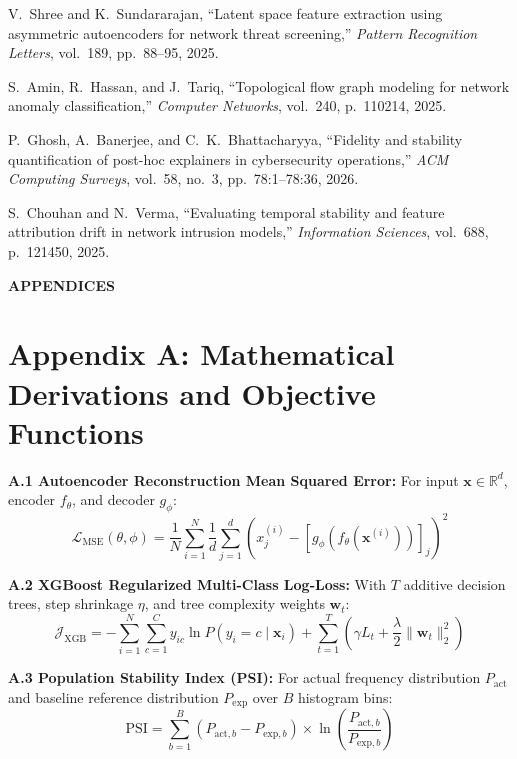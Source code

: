 \documentclass[12pt,a4paper]{report}
\begin{document}
\begin{enumerate}[label={[\arabic*]}, leftmargin=*, itemsep=4pt]
\item V.~Shree and K.~Sundararajan, ``Latent space feature extraction using asymmetric autoencoders for network threat screening,'' \emph{Pattern Recognition Letters}, vol.~189, pp.~88--95, 2025.
\item S.~Amin, R.~Hassan, and J.~Tariq, ``Topological flow graph modeling for network anomaly classification,'' \emph{Computer Networks}, vol.~240, p.~110214, 2025.
\item P.~Ghosh, A.~Banerjee, and C.~K.~Bhattacharyya, ``Fidelity and stability quantification of post-hoc explainers in cybersecurity operations,'' \emph{ACM Computing Surveys}, vol.~58, no.~3, pp.~78:1--78:36, 2026.
\item S.~Chouhan and N.~Verma, ``Evaluating temporal stability and feature attribution drift in network intrusion models,'' \emph{Information Sciences}, vol.~688, p.~121450, 2025.
\end{enumerate}

\clearpage
\begin{center}
{\Large\bfseries APPENDICES}\\[0.6cm]
\end{center}

\section*{Appendix A: Mathematical Derivations and Objective Functions}
\textbf{A.1 Autoencoder Reconstruction Mean Squared Error:}
For input $\mathbf{x} \in \mathbb{R}^d$, encoder $f_\theta$, and decoder $g_\phi$:
\begin{equation}
\mathcal{L}_{\text{MSE}}(\theta, \phi) = \frac{1}{N}\sum_{i=1}^N \frac{1}{d}\sum_{j=1}^d \left(x_j^{(i)} - [g_\phi(f_\theta(\mathbf{x}^{(i)}))]_j\right)^2
\label{eq:app_mse}
\end{equation}

\textbf{A.2 XGBoost Regularized Multi-Class Log-Loss:}
With $T$ additive decision trees, step shrinkage $\eta$, and tree complexity weights $\mathbf{w}_t$:
\begin{equation}
\mathcal{J}_{\text{XGB}} = -\sum_{i=1}^N \sum_{c=1}^C y_{ic} \ln P(y_i = c \mid \mathbf{x}_i) + \sum_{t=1}^T \left(\gamma L_t + \frac{\lambda}{2}\|\mathbf{w}_t\|_2^2\right)
\label{eq:app_xgb}
\end{equation}

\textbf{A.3 Population Stability Index (PSI):}
For actual frequency distribution $P_{\text{act}}$ and baseline reference distribution $P_{\text{exp}}$ over $B$ histogram bins:
\begin{equation}
\text{PSI} = \sum_{b=1}^B \left(P_{\text{act}, b} - P_{\text{exp}, b}\right) \times \ln\left(\frac{P_{\text{act}, b}}{P_{\text{exp}, b}}\right)
\label{eq:app_psi}
\end{equation}
\end{document}

